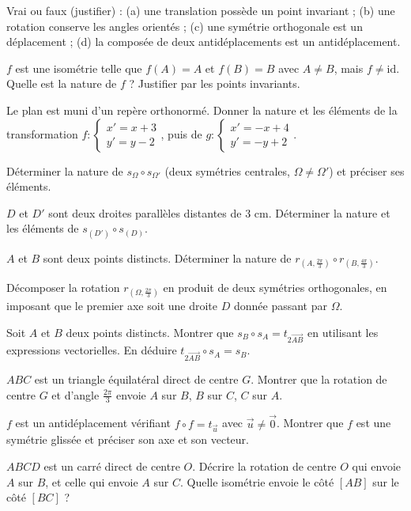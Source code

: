 \exo{} Vrai ou faux (justifier) : (a) une translation possède un point invariant ; (b) une rotation conserve les angles orientés ; (c) une symétrie orthogonale est un déplacement ; (d) la composée de deux antidéplacements est un antidéplacement.

\exo{} $f$ est une isométrie telle que $f(A)=A$ et $f(B)=B$ avec $A\neq B$, mais $f\neq\mathrm{id}$. Quelle est la nature de $f$ ? Justifier par les points invariants.

\exo{} Le plan est muni d'un repère orthonormé. Donner la nature et les éléments de la transformation $f:\begin{cases}x'=x+3\\ y'=y-2\end{cases}$, puis de $g:\begin{cases}x'=-x+4\\ y'=-y+2\end{cases}$.

\exo{} Déterminer la nature de $s_\Omega\circ s_{\Omega'}$ (deux symétries centrales, $\Omega\neq\Omega'$) et préciser ses éléments.

\exo{} $D$ et $D'$ sont deux droites parallèles distantes de $3$ cm. Déterminer la nature et les éléments de $s_{(D')}\circ s_{(D)}$.

\exo{} $A$ et $B$ sont deux points distincts. Déterminer la nature de $r_{(A,\frac{2\pi}{3})}\circ r_{(B,\frac{4\pi}{3})}$.

\exo{} Décomposer la rotation $r_{(\Omega,\frac{2\pi}{3})}$ en produit de deux symétries orthogonales, en imposant que le premier axe soit une droite $D$ donnée passant par $\Omega$.

\exo{} Soit $A$ et $B$ deux points distincts. Montrer que $s_B\circ s_A=t_{2\overrightarrow{AB}}$ en utilisant les expressions vectorielles. En déduire $t_{2\overrightarrow{AB}}\circ s_A=s_B$.

\exo{} $ABC$ est un triangle équilatéral direct de centre $G$. Montrer que la rotation de centre $G$ et d'angle $\frac{2\pi}{3}$ envoie $A$ sur $B$, $B$ sur $C$, $C$ sur $A$.

\exo{} $f$ est un antidéplacement vérifiant $f\circ f=t_{\vec u}$ avec $\vec u\neq\vec0$. Montrer que $f$ est une symétrie glissée et préciser son axe et son vecteur.

\exo{} $ABCD$ est un carré direct de centre $O$. Décrire la rotation de centre $O$ qui envoie $A$ sur $B$, et celle qui envoie $A$ sur $C$. Quelle isométrie envoie le côté $[AB]$ sur le côté $[BC]$ ?

